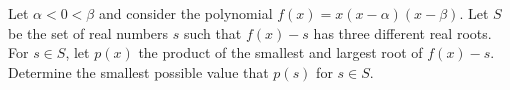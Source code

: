 Let $\alpha < 0 < \beta$ and consider the polynomial $f(x) = x(x-\alpha)(x-\beta)$. Let $S$ be the set of real numbers $s$ such that $f(x) - s$ has three different real roots. For $s\in S$, let $p(x)$ the product of the smallest and largest root of $f(x)-s$. Determine the smallest possible value that $p(s)$ for  $s\in S$.
